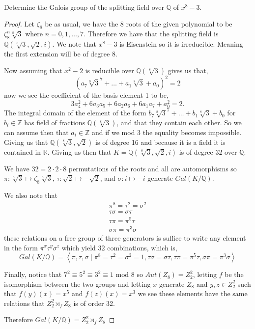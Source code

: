 \documentclass[11pt]{article}
\newenvironment{problem}[2][Problem\!]{\begin{tcolorbox}\begin{trivlist}
\item[\hskip \labelsep {\bfseries #1}\hskip \labelsep {\bfseries #2}]}{\end{trivlist}\end{tcolorbox}}
\newcommand{\zz}{\mathbb Z}   %
\newcommand{\qq}{\mathbb Q}   %
\newcommand{\rr}{\mathbb R}   %
\begin{document}
\vspace*{20pt}
\begin{problem}{14.2.10}
  Determine the Galois group of the splitting field over $\qq$ of $x^{8} - 3$.
\end{problem}
\begin{proof}
  Let $\zeta_8$ be as usual, we have the 8 roots of the given polynomial to be $\zeta_8^{n}\sqrt[8]{3}$ where $n = 0,1, \dots, 7$. Therefore we have that the splitting field is $\qq(\sqrt[8]{3},\sqrt{2},i)$. We note that $x^{8} -3$ is Eisenstein so it is irreducible. Meaning the first extension will be of degree 8.

  Now assuming that $x^{2}-2$ is reducible over $\qq(\sqrt[8]{3})$ gives us that,
  \[(a_7\sqrt[8]{3}^{7} + \dots + a_1\sqrt[8]{3} + a_0)^{2} = 2\]
  now we see the coefficient of the basis element 1 to be,
  \[3a_4^{2} + 6a_3a_5 + 6a_2a_6 + 6a_1a_7 + a_0^{2} = 2.\]
  The integral domain of the element of the form $b_7\sqrt[8]{3}^{7} + \dots + b_1\sqrt[8]{3} + b_0$ for $b_i \in \zz$ has field of fractions $\qq(\sqrt[8]{3})$, and that they contain each other. So we can assume then that $a_i \in \zz$ and if we mod 3 the equality becomes impossible. Giving us that $\qq(\sqrt[8]{3},\sqrt{2})$ is of degree 16 and because it is a field it is contained in $\rr$. Giving us then that $K = \qq(\sqrt[8]{3},\sqrt{2}, i )$ is of degree 32 over $\qq$. 

  We have $32 = 2 \cdot 2 \cdot 8$ permutations of the roots and all are automorphisms so $\pi: \sqrt[8]{3} \mapsto \zeta_8\sqrt[8]{3}$, $\tau: \sqrt{2}\mapsto -\sqrt{2}$, and $\sigma: i \mapsto -i$ generate $Gal(K/\qq)$. 

  We also note that
  \begin{align*}
    \pi^{8} = \tau^{2} = \sigma^{2} \\
    \tau\sigma = \sigma\tau \\
    \tau\pi = \pi^{5}\tau \\
    \sigma\pi = \pi^{3}\sigma
  \end{align*}
  these relations on a free group of three generators is suffice to write any element in the form $\pi^{x}\tau^{y}\sigma^{z}$ which yield 32 combinations, which is,
  \[Gal(K/\qq) = \left<\pi,\tau,\sigma \mid \pi^{8} = \tau^{2} = \sigma^{2} = 1, \tau\sigma = \sigma \tau, \tau\pi = \pi^{5}\tau, \sigma\pi = \pi^{3}\sigma\right>\] 


  Finally, notice that $7^{2} \equiv 5^{2} \equiv 3^{2} \equiv 1 \text{ mod }8$ so $Aut(Z_8) = Z_2^{2}$, letting $f$ be the isomorphism between the two groups and letting $x$ generate $Z_8$ and $y,z \in Z_2^{2}$ such that $f(y)(x) = x^{5}$ and $f(z)(x) = x^{3}$ we see these elements have the same relations that $Z_2^{2}\rtimes_f Z_8 $ is of order 32.

  Therefore $Gal(K/\qq) = Z_2^{2} \rtimes_f Z_8$
\end{proof}
\end{document}
